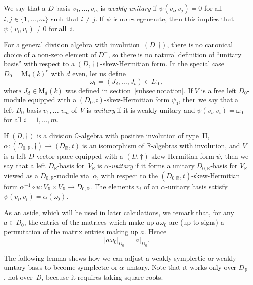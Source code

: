 \documentclass[11pt]{article}
\numberwithin{equation}{section}
\newcommand{\bQ}{\mathbb{Q}}
\newcommand{\bR}{\mathbb{R}}
\newcommand{\rM}{\mathrm{M}}
\newcommand{\abs}[1]{\lvert #1 \rvert}
\newcommand{\defterm}[1]{\emph{#1}}
\begin{document}
We say that a $D$-basis $v_1, \dotsc, v_m$ is \defterm{weakly unitary} if $\psi(v_i, v_j) = 0$ for all $i, j \in \{ 1, \dotsc, m \}$ such that $i \neq j$.
If $\psi$ is non-degenerate, then this implies that $\psi(v_i, v_i) \neq 0$ for all~$i$.

For a general division algebra with involution~$(D,\dag)$, there is no canonical choice of a non-zero element of $D^-$, so there is no natural definition of ``unitary basis'' with respect to a $(D,\dag)$-skew-Hermitian form.
In the special case $D_0 = \rM_d(k)^e$ with $d$ even, let us define
\[
\omega_0 = ( J_d, \dotsc, J_d ) \in D_0^-,
\]
where $J_d \in \rM_d(k)$ was defined in section~\ref{subsec:notation}.
If $V$ is a free left $D_0$-module equipped with a $(D_0,t)$-skew-Hermitian form $\psi_0$, then we say that a left $D_0$-basis $v_1, \dotsc, v_m$ of~$V$ is \defterm{unitary} if it is weakly unitary and $\psi(v_i, v_i) = \omega_0$ for all $i = 1, \dotsc, m$.

If $(D,\dag)$ is a division $\bQ$-algebra with positive involution of type~II, $\alpha \colon (D_{0,\bR},\dag) \to (D_\bR,t)$ is an isomorphism of $\bR$-algebras with involution, and $V$ is a left $D$-vector space equipped with a $(D,\dag)$-skew-Hermitian form $\psi$, then we say that a left $D_\bR$-basis for~$V_\bR$ is \defterm{$\alpha$-unitary} if it forms a unitary $D_{0,\bR}$-basis for $V_\bR$ viewed as a $D_{0,\bR}$-module via~$\alpha$, with respect to the $(D_{0,\bR},t)$-skew-Hermitian form $\alpha^{-1} \circ \psi \colon V_\bR \times V_\bR \to D_{0,\bR}$.
The elements $v_i$ of an $\alpha$-unitary basis satisfy $\psi(v_i, v_i) = \alpha(\omega_0)$.

As an aside, which will be used in later calculations, we remark that, for any $a \in D_0$, the entries of the matrices which make up $a \omega_0$ are (up to signs) a permutation of the matrix entries making up $a$. Hence
\begin{equation} \label{eqn:a-omega0}
\abs{a\omega_0}_{D_0} = \abs{a}_{D_0}.
\end{equation}

The following lemma shows how we can adjust a weakly symplectic or weakly unitary basis to become symplectic or $\alpha$-unitary. Note that it works only over $D_\bR$, not over~$D$, because it requires taking square roots.
\end{document}
